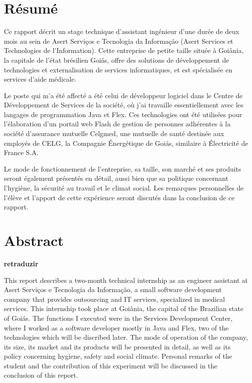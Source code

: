\section*{Résumé}

Ce rapport décrit un stage technique d'assistant ingénieur d'une durée de deux mois au sein de Asert Serviços e Tecnologia da Informação (Asert Services et Technologies de l'Information). Cette entreprise de petite taille située à Goiânia, la capitale de l'état brésilien Goiás, offre des solutions de développement de technologies et externalisation de services informatiques, et est spécialisée en services d'aide médicale. 

Le poste qui m'a été affecté a été celui de développeur logiciel dans le Centre de Développement de Services de la société, où j'ai travaille essentiellement avec les langages de programmation Java et Flex. Ces technologies ont été utilisées pour l'élaboration d'un portail web Flash de gestion de personnes adhérentes à la société d'assurance mutuelle Celgmed, une mutuelle de santé destinée aux employés de CELG, la Compagnie Énergétique de Goiás, similaire à Électricité de France S.A.

Le mode de fonctionnement de l'entreprise, sa taille, son marché et ses produits seront également présentés en détail, aussi bien que sa politique concernant l'hygiène, la sécurité au travail et le climat social. Les remarques personnelles de l'élève et l'apport de cette expérience seront discutés dans la conclusion de ce rapport.


\section*{Abstract}

\begin{center}
\bfseries retraduzir
\end{center}

This report describes a two-month technical internship as an engineer assistant at Asert Serviços e Tecnologia da Informação, a small software development company that provides outsourcing and IT services, specialized in medical services. This internship took place at Goiânia, the capital of the Brazilian state of Goiás. The functions I executed were in the Services Development Center, where I worked as a software developer mostly in Java and Flex, two of the technologies which will be discribed later. The mode of operation of the company, its size, its market and its products will be presented in
detail, as well as its policy concerning hygiene, safety and social climate. Personal remarks of the student and the contribution of this experiment will be discussed in the conclusion of this report.
